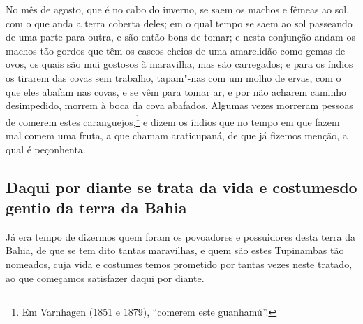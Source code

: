 \begin{linenumbers}
No mês de agosto, que é no cabo do inverno, se saem os machos e fêmeas ao sol, com o que
anda a terra coberta deles; em o qual tempo se saem ao sol passeando de uma parte para
outra, e são então bons de tomar; e nesta conjunção andam os machos tão gordos que têm os
cascos cheios de uma amarelidão como gemas de ovos, os quais são mui gostosos à maravilha,
mas são carregados; e para os índios os tirarem das covas sem trabalho, tapam"-nas com um
molho de ervas, com o que eles abafam nas covas, e se vêm para tomar ar, e por não acharem
caminho desimpedido, morrem à boca da cova abafados. Algumas vezes morreram pessoas de
comerem estes caranguejos,\footnote{ Em Varnhagen (1851 e 1879), ``comerem este
guanhamú''.} e dizem os índios que no tempo em que fazem mal comem uma fruta, a que chamam
araticupaná, de que já fizemos menção, a qual é peçonhenta.

\subsection{Daqui por diante se trata da vida e costumes\break do gentio da terra da Bahia}

Já era tempo de dizermos quem foram os povoadores e possuidores desta terra da Bahia, de
que se tem dito tantas maravilhas, e quem são estes Tupinambas tão nomeados, cuja vida e
costumes temos prometido por tantas vezes neste tratado, ao que começamos satisfazer daqui
por diante.


\end{linenumbers}
